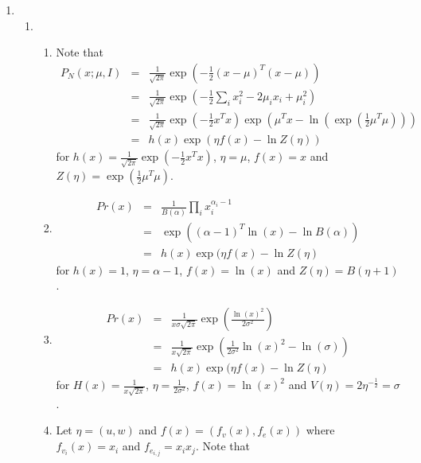 \documentclass{article}
\begin{document}
\begin{enumerate}
	\item 
		\begin{enumerate}
			\item
			\begin{enumerate}
				\item Note that 
					\begin{equation}
						\begin{aligned} 
							P_N(x; \mu, I) & = & \frac{1}{\sqrt{2\pi}}\exp(-\frac{1}{2}(x -\mu)^T(x-\mu)) \\
							& = & \frac{1}{\sqrt{2\pi}}\exp(-\frac{1}{2}\sum_i x_i^2 -2\mu_ix_i + \mu_i^2) \\ 
							& = & \frac{1}{\sqrt{2\pi}}\exp(-\frac{1}{2} x^Tx)\exp(\mu^T x - \ln(\exp(\frac{1}{2}\mu^T\mu))) \\
							& = & h(x)\exp(\eta f(x) - \ln Z(\eta))
						\end{aligned}
					\end{equation}
					for $h(x) = \frac{1}{\sqrt{2\pi}}\exp(-\frac{1}{2} x^Tx)$, $\eta = \mu$, $f(x) = x$ and $Z(\eta) = \exp(\frac{1}{2}\mu^T\mu)$.
				\item 
					\begin{equation}
						\begin{aligned}
							Pr(x) & = & \frac{1}{B(\alpha)}\prod_{i} x_i^{\alpha_i - 1} \\
							& = & \exp((\alpha - 1)^T\ln(x) - \ln B(\alpha)) \\
							& = &  h(x)\exp(\eta f(x) - \ln Z(\eta)
						\end{aligned}
					\end{equation}
					for $h(x) = 1$, $\eta = \alpha - 1$, $f(x) = \ln(x)$ and $Z(\eta) = B(\eta + 1)$.
				\item 
					\begin{equation}
						\begin{aligned}
							Pr(x) & = & \frac{1}{x\sigma \sqrt{2\pi}} \exp(\frac{\ln(x)^2}{2\sigma^2}) \\
							& = & \frac{1}{x \sqrt{2\pi}}\exp(\frac{1}{2\sigma^2}\ln(x)^2 - \ln(\sigma)) \\
							& = &  h(x)\exp(\eta f(x) - \ln Z(\eta)
						\end{aligned}
					\end{equation}
					for $H(x) = \frac{1}{x \sqrt{2\pi}}$, $\eta = \frac{1}{2\sigma^2}$, $f(x) = \ln(x)^2$ and $V(\eta) = 2\eta^{-\frac{1}{2}} = \sigma$.
				\item Let $\eta = (u, w)$ and $f(x) = (f_v(x), f_e(x))$ where $f_{v_i}(x) = x_i$ and $f_{e_{i,j}} = x_ix_j$. Note that

\end{enumerate}
\end{enumerate}
\end{enumerate}
\end{document}
